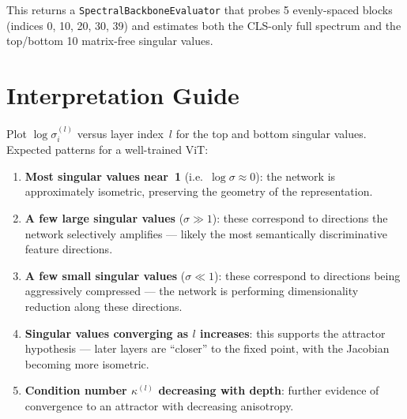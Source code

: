 \documentclass[11pt]{article}
\begin{document}
This returns a \texttt{SpectralBackboneEvaluator} that probes 5
evenly-spaced blocks (indices 0, 10, 20, 30, 39) and estimates both the
CLS-only full spectrum and the top/bottom 10 matrix-free singular values.


\section{Interpretation Guide}

Plot $\log\sigma_i^{(l)}$ versus layer index~$l$ for the top and bottom
singular values.  Expected patterns for a well-trained ViT:

\begin{enumerate}
    \item \textbf{Most singular values near~1} (i.e.\
        $\log\sigma \approx 0$): the network is approximately isometric,
        preserving the geometry of the representation.

    \item \textbf{A few large singular values} ($\sigma \gg 1$):
        these correspond to directions the network selectively amplifies
        --- likely the most semantically discriminative feature
        directions.

    \item \textbf{A few small singular values} ($\sigma \ll 1$):
        these correspond to directions being aggressively compressed ---
        the network is performing dimensionality reduction along these
        directions.

    \item \textbf{Singular values converging as $l$ increases}: this
        supports the attractor hypothesis --- later layers are ``closer''
        to the fixed point, with the Jacobian becoming more isometric.

    \item \textbf{Condition number $\kappa^{(l)}$ decreasing with depth}:
        further evidence of convergence to an attractor with decreasing
        anisotropy.
\end{enumerate}
\end{document}
